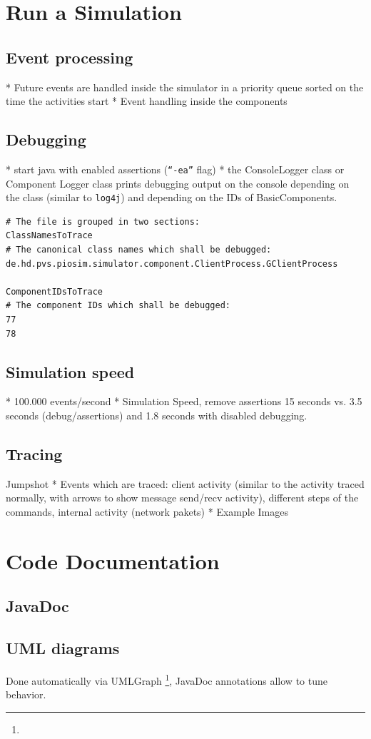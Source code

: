 \documentclass[
     11pt,         %
     a4paper,      %
     BCOR10mm,     %
     DIV14,        %
     liststotoc,   %
     bibtotoc,     %
     idxtotoc,     %
     parskip       %
     ]{scrreprt}   %
\begin{document}
\section{Run a Simulation}
\subsection{Event processing}
* Future events are handled inside the simulator in a priority queue sorted on the time the activities start
* Event handling inside the components

\subsection{Debugging}
* start java with enabled assertions (\texttt{"`-ea"'} flag)
* the ConsoleLogger class or Component Logger class prints debugging output on the console
depending on the class (similar to \texttt{log4j}) and depending on the IDs of BasicComponents.
\begin{verbatim}
# The file is grouped in two sections:
ClassNamesToTrace
# The canonical class names which shall be debugged:
de.hd.pvs.piosim.simulator.component.ClientProcess.GClientProcess

ComponentIDsToTrace
# The component IDs which shall be debugged:
77
78
\end{verbatim}

\subsection{Simulation speed}
* 100.000 events/second
* Simulation Speed, remove assertions 15 seconds vs. 3.5 seconds (debug/assertions) and 1.8 seconds with disabled debugging.

\subsection{Tracing}
Jumpshot
* Events which are traced: client activity (similar to the activity traced normally, with arrows to show message send/recv activity), different steps of the  commands, internal activity (network pakets)
* Example Images

\section{Code Documentation}
\subsection{JavaDoc}

\subsection{UML diagrams}
Done automatically via UMLGraph \footnote{}, JavaDoc annotations
allow to tune behavior.

\appendix

\listoffigures
\listoftables



\end{document}
